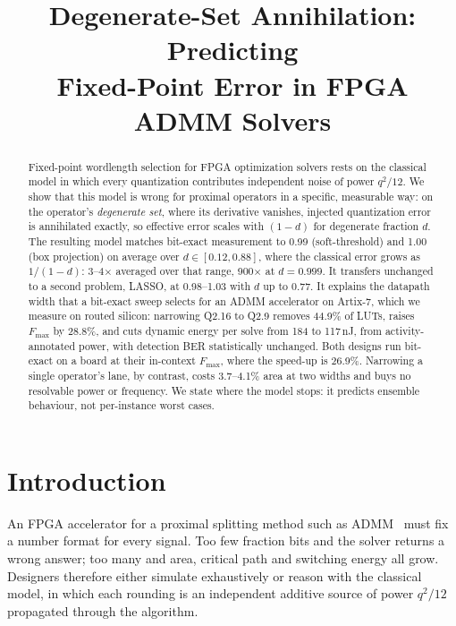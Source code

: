 \documentclass[conference]{IEEEtran}
\begin{document}
\title{Degenerate-Set Annihilation: Predicting\\Fixed-Point Error in FPGA ADMM Solvers}

\author{
}

\maketitle

\begin{abstract}
Fixed-point wordlength selection for FPGA optimization solvers rests on the
classical model in which every quantization contributes independent noise of
power $q^2/12$. We show that this model is wrong for proximal operators in a
specific, measurable way: on the operator's \emph{degenerate set}, where its
derivative vanishes, injected quantization error is annihilated exactly, so
effective error scales with $(1-d)$ for degenerate fraction $d$. The resulting
model matches bit-exact measurement to 0.99 (soft-threshold) and 1.00 (box
projection) on average over $d\in[0.12,0.88]$, where the classical error grows
as $1/(1-d)$: 3--4$\times$ averaged over that range, 900$\times$ at $d=0.999$. It transfers unchanged to a second
problem, LASSO, at 0.98--1.03 with $d$ up to 0.77. It explains the datapath width that a bit-exact sweep selects for an ADMM
accelerator on Artix-7, which we measure on routed silicon: narrowing Q2.16 to
Q2.9 removes 44.9\% of LUTs, raises $F_{\max}$ by 28.8\%, and cuts dynamic
energy per solve from 184 to 117\,nJ, from activity-annotated power, with
detection BER statistically unchanged. Both designs run bit-exact on a board at their in-context $F_{\max}$,
where the speed-up is 26.9\%. Narrowing a single operator's lane, by contrast, costs 3.7--4.1\% area at two
widths and buys no resolvable power or frequency. We state where the model
stops: it predicts ensemble behaviour, not per-instance worst cases.
\end{abstract}

\section{Introduction}

An FPGA accelerator for a proximal splitting method such as ADMM~\cite{boyd2011admm}
must fix a number format for every signal. Too few fraction bits and the solver
returns a wrong answer; too many and area, critical path and switching energy
all grow. Designers therefore either simulate exhaustively or reason with the
classical model, in which each rounding is an independent additive source of
power $q^2/12$~\cite{widrow2008quant} propagated through the algorithm.
\end{document}
